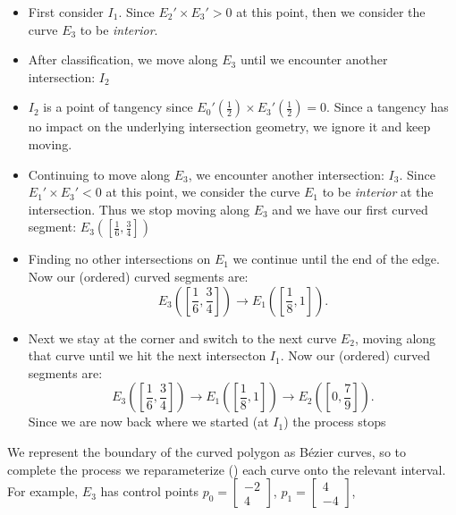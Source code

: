 \documentclass[oneside, reqno]{amsart}
\theoremstyle{definition}
\begin{document}
\begin{itemize}
\itemsep 0em
\item First consider \(I_1\). Since
  \(E_2' \times
  E_3' > 0\)
  at this point, then we consider the curve
  \(E_3\) to be
  \emph{interior}.
\item After classification, we move along
  \(E_3\) until we
  encounter another intersection: \(I_2\)
\item \(I_2\) is a point of tangency since
  \(E_0'\left(\frac{1}{2}\right) \times
  E_3'\left(\frac{1}{2}\right) = 0\).
  Since a tangency has no impact on
  the underlying intersection geometry, we ignore it and
  keep moving.
\item Continuing to move along
  \(E_3\), we
  encounter another intersection: \(I_3\).
  Since
  \(E_1' \times
  E_3' < 0\)
  at this point, we consider the curve
  \(E_1\) to be
  \emph{interior} at the intersection. Thus we stop moving
  along \(E_3\)
  and we have our first curved segment:
  \(E_3\left(\left[
    \frac{1}{6}, \frac{3}{4}\right]\right)\)
\item Finding no other intersections on \(E_1\)
  we continue until the end of the edge.
  Now our (ordered) curved segments are:
  \begin{equation}
  E_3\left(\left[
    \frac{1}{6}, \frac{3}{4}\right]\right) \longrightarrow
  E_1\left(\left[
    \frac{1}{8}, 1\right]\right).
  \end{equation}
\item Next we stay at the corner and switch to the next curve
  \(E_2\), moving along that curve
  until we hit the next intersecton \(I_1\).
  Now our (ordered) curved segments are:
  \begin{equation}
  E_3\left(\left[
    \frac{1}{6}, \frac{3}{4}\right]\right) \longrightarrow
  E_1\left(\left[
    \frac{1}{8}, 1\right]\right) \longrightarrow
  E_2\left(\left[
    0, \frac{7}{9}\right]\right).
  \end{equation}
  Since we are now back where we started (at \(I_1\))
  the process stops
\end{itemize}
We represent the boundary of the curved polygon as B\'{e}zier curves, so
to complete the process we reparameterize (\cite[Ch.~5.4]{Farin2001}) each
curve onto the relevant interval. For example,
\(E_3\) has control points
\(p_0 = \left[ \begin{array}{c} -2 \\ 4 \end{array}\right]\),
\(p_1 = \left[ \begin{array}{c} 4 \\ -4 \end{array}\right]\),
\end{document}
